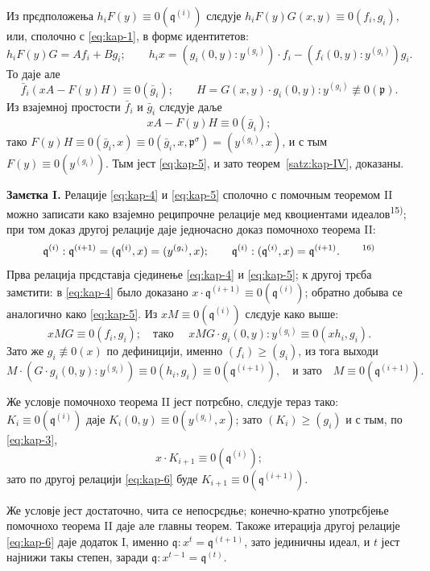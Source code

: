 \documentclass[11pt]{article}
\theoremstyle{plain}
\begin{document}
Из прєдположења $h_{i}F(y) \equiv 0(\mathfrak{q}^{(i)})$
слєдује
$h_{i}F(y)G(x,y) \equiv 0(f_{i}, g_{i})$, или, сполочно
с \eqref{eq:kap-1}, в формє идентитетов:
\[
h_{i}F(y)G = Af_{i} + Bg_{i}; \qquad
h_{i}x = (g_{i}(0,y):y^{(g_{i})})\cdot f_{i}
- (f_{i}(0,y):y^{(g_{i})})g_{i}.
\]
То даје але
\[
\bar{f}_{i}(xA - F(y)H) \equiv 0(\bar{g}_{i}); \qquad
H = G(x,y) \cdot g_{i}(0,y) : y^{(g_{i})} \not\equiv 0(\mathfrak{p}).
\]
Из взајемној простости $\bar{f}_{i}$ и $\bar{g}_{i}$ слєдује даље
\[
xA - F(y)H \equiv 0(\bar{g}_{i});
\]
тако $F(y)H \equiv 0(\bar{g}_{i}, x)
\equiv 0(\bar{g}_{i}, x, \mathfrak{p}^{\sigma})
= (y^{(g_{i})}, x)$, и с тым $F(y) \equiv 0(y^{(g_{i})})$.
Тым јест \eqref{eq:kap-5}, и зато теорем~\ref{satz:kap-IV}, доказаны.

\smallskip
\textbf{Замєтка I.} Релације \eqref{eq:kap-4} и \eqref{eq:kap-5}
сполочно с помочным теоремом II можно записати како взајемно
реципрочне релације мед квоциентами идеалов\textsuperscript{15)};
при том доказ другој релације даје једночасно доказ помочнохо
теорема II:
\begin{equation}\label{eq:kap-6}
\mathfrak{q}^{(i)} : \mathfrak{q}^{(i+1)}
= (\mathfrak{q}^{(i)}, x) = (y^{(g_{i})}, x); \qquad
\mathfrak{q}^{(i)} : (\mathfrak{q}^{(i)}, x)
= \mathfrak{q}^{(i+1)}.\qquad\text{\textsuperscript{16)}}
\end{equation}
Прва релација прєдставја сјединење \eqref{eq:kap-4} и
\eqref{eq:kap-5}; к другој трєба замєтити: в \eqref{eq:kap-4}
было доказано
$x \cdot \mathfrak{q}^{(i+1)} \equiv 0(\mathfrak{q}^{(i)})$;
обратно добыва се аналогично како \eqref{eq:kap-5}. Из
$xM \equiv 0(\mathfrak{q}^{(i)})$ слєдује како выше:
\[
xMG \equiv 0(f_{i}, g_{i}); \quad \text{тако }\quad
xMG \cdot g_{i}(0,y) : y^{(g_{i})}
\equiv 0(xh_{i}, g_{i}).
\]
Зато же $g_{i} \not\equiv 0(x)$ по дефиницији, именно
$(f_{i}) \geq (g_{i})$, из тога выходи
\[
M \cdot (G \cdot g_{i}(0,y) : y^{(g_{i})})
\equiv 0(h_{i}, g_{i}) \equiv 0(\mathfrak{q}^{(i+1)}),
\quad\text{и зато}\quad M \equiv 0(\mathfrak{q}^{(i+1)}).
\]

Же условје помочнохо теорема II јест потрєбно, слєдује тераз тако:
$K_{i} \equiv 0(\mathfrak{q}^{(i)})$ даје
$K_{i}(0,y) \equiv 0(y^{(g_{i})}, x)$; зато
$(K_{i}) \geq (g_{i})$ и с тым, по \eqref{eq:kap-3},
\[
x \cdot K_{i+1} \equiv 0(\mathfrak{q}^{(i)});
\]
зато по другој релацији \eqref{eq:kap-6} буде
$K_{i+1} \equiv 0(\mathfrak{q}^{(i+1)})$.

Же условје јест достаточно, чита се непосрєдње; конечно-кратно
употрєбјење помочнохо теорема II даје але главны теорем. Такоже
итерација другој релације \eqref{eq:kap-6} даје додаток I, именно
$\mathfrak{q} : x^{t} = \mathfrak{q}^{(t+1)}$, зато јединичны
идеал, и $t$ јест најнижи такы степен, заради
$\mathfrak{q} : x^{t-1} = \mathfrak{q}^{(t)}$.
\end{document}
